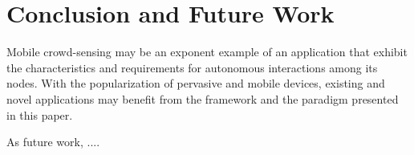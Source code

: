 \section{Conclusion and Future Work}\label{sec:conclusion}


Mobile crowd-sensing may be an exponent example of an application that exhibit the characteristics and requirements for autonomous interactions among its nodes. With the popularization of pervasive and mobile devices, existing and novel applications may benefit from the framework and the paradigm presented in this paper.

As future work, ....